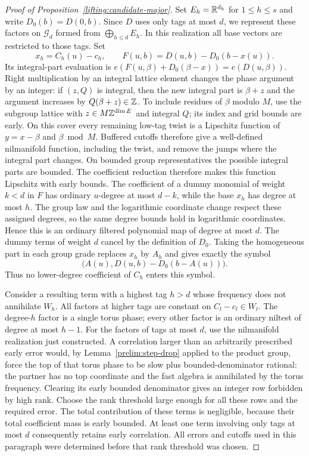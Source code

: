 \begin{proof}[Proof of Proposition~\ref{lifting:candidate-major}]
Set $E_h=\mathbb R^{d_h}$ for $1\le h\le s$ and write $D_0(b)=D(0,b)$.
Since $D$ uses only tags at most $d$, we represent these factors on
$\mathscr G_d$ formed from $\bigoplus_{h\le d}E_h$.  In this
realization all base vectors are restricted to those tags.  Set
\[
 x_h=C_h(u)-c_h,\qquad
 F(u,b)=D(u,b)-D_0(b-x(u)).
\]
Its integral-part evaluation is
$e(F(u,\beta)+D_0(\beta-x))=e(D(u,\beta))$.
Right multiplication by an integral lattice element changes the
phase argument by an integer: if $(z,Q)$ is integral, then the new
integral part is $\beta+z$ and the argument increases by
$Q(\beta+z)\in\mathbb Z$.  To include residues of $\beta$ modulo $M$,
use the subgroup lattice with $z\in M\mathbb Z^{\dim E}$ and integral
$Q$; its index and grid bounds are early.  On this cover every remaining low-tag
twist is a Lipschitz function of $y=x-\beta$ and $\beta\bmod M$.
Buffered cutoffs therefore give a well-defined nilmanifold function,
including the twist, and remove the jumps where the integral part
changes.
On bounded group representatives the possible integral parts are
bounded.  The coefficient reduction therefore makes this function
Lipschitz with early bounds.  The coefficient of a dummy monomial of
weight $k<d$ in $F$ has ordinary $u$-degree at most $d-k$, while the
base $x_h$ has degree at most $h$.  The group law and the logarithmic
coordinate change respect these assigned degrees, so the same degree
bounds hold in logarithmic coordinates.  Hence this is an ordinary
filtered polynomial map of degree at most $d$.  The dummy terms of
weight $d$ cancel by the definition of $D_0$.  Taking the homogeneous
part in each group grade replaces $x_h$ by $A_h$ and gives exactly
the symbol
\[
             \bigl(A(u),D(u,b)-D_0(b-A(u))\bigr).
\]
Thus no lower-degree coefficient of $C_h$ enters this symbol.

Consider a resulting term with a highest tag $h>d$ whose frequency
does not annihilate $W_h$.  All factors at higher tags are constant
on $C_l-c_l\in W_l$.  The degree-$h$ factor is a single torus phase;
every other factor is an ordinary niltest of degree at most $h-1$.
For the factors of tags at most $d$, use the nilmanifold
realization just constructed.  A correlation larger than
an arbitrarily prescribed early error would, by
Lemma~\ref{prelim:step-drop} applied to the product group, force the
top of that torus phase to be slow plus bounded-denominator rational:
the partner has no top coordinate and the fast algebra is annihilated
by the torus frequency.  Clearing its early bounded denominator gives
an integer row forbidden by high rank.  Choose the rank threshold
large enough for all these rows and the required error.  The total
contribution of these terms is negligible, because their total
coefficient mass is early bounded.  At least one term involving only
tags at most $d$ consequently retains early correlation.  All errors
and cutoffs used in this paragraph were determined before that rank
threshold was chosen.


\end{proof}
